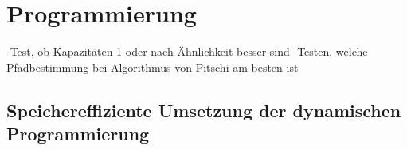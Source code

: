 \chapter{Programmierung}
\label{ch:Programmierung}

-Test, ob Kapazitäten 1 oder nach Ähnlichkeit besser sind
-Testen, welche Pfadbestimmung bei Algorithmus von Pitschi am besten ist

\section{Speichereffiziente Umsetzung der dynamischen Programmierung}